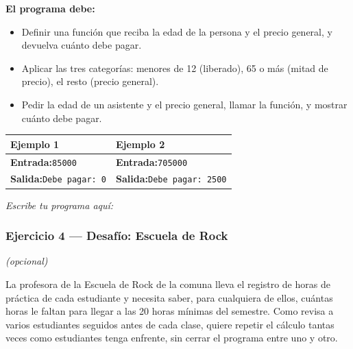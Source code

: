 \documentclass[11pt]{article}
\begin{document}
\textbf{El programa debe:}
\begin{itemize}
  \item Definir una función que reciba la edad de la persona y el precio general, y devuelva cuánto debe pagar.
  \item Aplicar las tres categorías: menores de 12 (liberado), 65 o más (mitad de precio), el resto (precio general).
  \item Pedir la edad de un asistente y el precio general, llamar la función, y mostrar cuánto debe pagar.
\end{itemize}
\vspace{1mm}
\noindent\begin{tabularx}{\linewidth}{|X|X|}
\hline
\textbf{Ejemplo 1} & \textbf{Ejemplo 2} \\
\hline
\textbf{Entrada:}\newline \texttt{8}\newline \texttt{5000} & \textbf{Entrada:}\newline \texttt{70}\newline \texttt{5000} \\
\hline
\textbf{Salida:}\newline \texttt{Debe pagar: 0} & \textbf{Salida:}\newline \texttt{Debe pagar: 2500} \\
\hline
\end{tabularx}
\vspace{1mm}
\vspace{2mm}\textit{Escribe tu programa aquí:}\vspace{1mm}

\begin{cajaescribe}[height=4.5cm]
\end{cajaescribe}

\subsubsection*{Ejercicio 4 --- Desafío: Escuela de Rock}
\textit{(opcional)}

La profesora de la Escuela de Rock de la comuna lleva el registro de horas de práctica de cada estudiante y necesita saber, para cualquiera de ellos, cuántas horas le faltan para llegar a las 20 horas mínimas del semestre. Como revisa a varios estudiantes seguidos antes de cada clase, quiere repetir el cálculo tantas veces como estudiantes tenga enfrente, sin cerrar el programa entre uno y otro.
\end{document}
